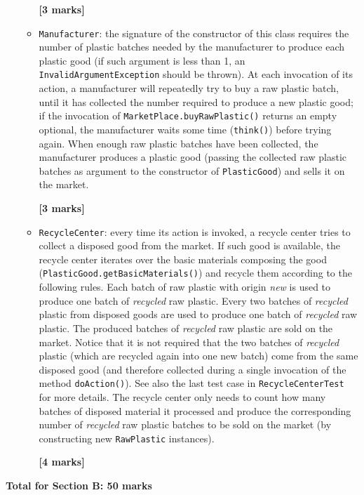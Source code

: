 \documentclass[a4wide,11pt]{article}
\renewcommand{\j}[1]{\texttt{#1}}
\begin{document}
\begin{enumerate}
\begin{itemize}
\textbf{[3 marks]}

	\item \j{Manufacturer}: the signature of the constructor of this class
requires the number of plastic batches needed by the manufacturer to produce
each plastic good (if such argument is less than 1, an
\j{InvalidArgumentException} should be thrown).
At each invocation of its action, a manufacturer will
repeatedly try to buy a raw plastic batch, until it has collected the number
required to produce a new plastic good; if the invocation of
\j{MarketPlace.buyRawPlastic()}
returns an empty optional, the manufacturer waits some time (\j{think()})
before
trying again. When enough raw plastic batches have been collected, the
manufacturer produces a plastic good (passing the collected raw plastic batches
as argument to the constructor of \j{PlasticGood}) and sells it on the market.

\textbf{[3 marks]}

\item \j{RecycleCenter}: every time its action is invoked, a recycle center
tries to collect a disposed good from the market. If such good is available,
the recycle center iterates over the basic
materials composing the good (\j{PlasticGood.getBasicMaterials()}) and recycle
them according to the following rules.
Each batch of raw plastic with origin \emph{new} is used to produce one batch
of \emph{recycled} raw plastic. Every two batches of \emph{recycled} plastic
from disposed goods are used to produce one batch
of \emph{recycled} raw plastic. The produced batches of \emph{recycled} raw
plastic are sold on the market. Notice that it is not required that the two
batches of \emph{recycled} plastic (which are recycled again into one new
batch) 
come from
the same disposed good (and therefore collected during a single invocation of
the method \j{doAction()}). See also the last test case in 
\j{RecycleCenterTest} for more details.
The recycle center only needs to count how many batches
of disposed material it processed and produce the corresponding number of
\emph{recycled} raw plastic batches to be sold on the market (by constructing
new \j{RawPlastic} instances).

\textbf{[4 marks]}
\end{itemize}

\end{enumerate}



\textbf{Total for Section B: 50 marks}
\end{document}
